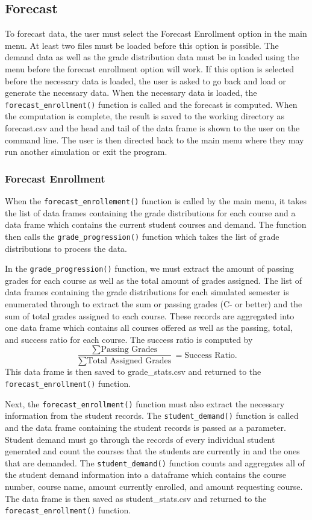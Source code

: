 \documentclass[12pt]{article}
\begin{document}
\subsection*{Forecast}
To forecast data, the user must select the Forecast Enrollment option in the main menu. At least two files must be 
loaded before this option is possible. The demand data as well as the grade distribution data must be in loaded using
the menu before the forecast enrollment option will work. If this option is selected before the necessary data is loaded, 
the user is asked to go back and load or generate the necessary data. When the necessary data is loaded, the 
\texttt{forecast\_enrollment()} function is called and the forecast is computed. When the computation is complete, the 
result is saved to the working directory as forecast.csv and the head and tail of the data frame is shown to the user 
on the command line. The user is then directed back to the main menu where they may run another simulation or 
exit the program.

\subsubsection*{Forecast Enrollment}
When the \texttt{forecast\_enrollement()} function is called by the main menu, it takes the list of data frames containing 
the grade distributions for each course and a data frame which contains the current student courses and demand. The
function then calls the \texttt{grade\_progression()} function which takes the list of grade distributions to process the data.

In the \texttt{grade\_progression()} function, we must extract the amount of passing grades for each course as well as the
total amount of grades assigned. The list of data frames containing the grade distributions for each simulated semester
is enumerated through to extract the sum or passing grades (C- or better) and the sum of total grades assigned to each 
course. These records are aggregated into one data frame which contains all courses offered as well as the passing, total, 
and success ratio for each course. The success ratio is computed by 
$$
\frac{\sum \text{Passing Grades}}{\sum \text{Total Assigned Grades}} = \text{Success Ratio}.
$$
This data frame is then saved to grade\_stats.csv and returned to the \texttt{forecast\_enrollment()} function. 

Next, the \texttt{forecast\_enrollment()} function must also extract the necessary information from the student records. 
The \texttt{student\_demand()} function is called and the data frame containing the student records is passed as 
a parameter. Student demand must go through the records of every individual student generated and count the 
courses that the students are currently in and the ones that are demanded. The \texttt{student\_demand()} function 
counts and aggregates all of the student demand information into a dataframe which contains the course number, 
course name, amount currently enrolled, and amount requesting course. The data frame is then saved as 
student\_stats.csv and returned to the \texttt{forecast\_enrollment()} function.
\end{document}

